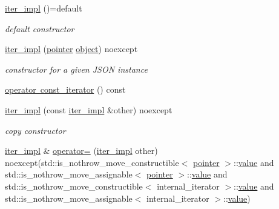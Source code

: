\begin{DoxyCompactItemize}
\item 
\mbox{\hyperlink{classnlohmann_1_1basic__json_1_1iter__impl_a3e45be67e4384b3eacb72bd6147a6a91}{iter\+\_\+impl}} ()=default
\begin{DoxyCompactList}\small\item\em default constructor \end{DoxyCompactList}\item 
\mbox{\hyperlink{classnlohmann_1_1basic__json_1_1iter__impl_aa496f5348569e75d65592f25e1664770}{iter\+\_\+impl}} (\mbox{\hyperlink{classnlohmann_1_1basic__json_1_1iter__impl_a3dddd7fa38b36e2531700ceb4a1ce9a8}{pointer}} \mbox{\hyperlink{classnlohmann_1_1basic__json_a9f42ee7d10eee2d5a73fd94ca7f767ca}{object}}) noexcept
\begin{DoxyCompactList}\small\item\em constructor for a given J\+S\+ON instance \end{DoxyCompactList}\item 
\mbox{\hyperlink{classnlohmann_1_1basic__json_1_1iter__impl_af1963645f99993ac5d0d2f8516e07212}{operator const\+\_\+iterator}} () const
\item 
\mbox{\hyperlink{classnlohmann_1_1basic__json_1_1iter__impl_a94c010c069b5aed9e064e0579eac9a64}{iter\+\_\+impl}} (const \mbox{\hyperlink{classnlohmann_1_1basic__json_1_1iter__impl}{iter\+\_\+impl}} \&other) noexcept
\begin{DoxyCompactList}\small\item\em copy constructor \end{DoxyCompactList}\item 
\mbox{\hyperlink{classnlohmann_1_1basic__json_1_1iter__impl}{iter\+\_\+impl}} \& \mbox{\hyperlink{classnlohmann_1_1basic__json_1_1iter__impl_a083d9d5465de7ddfb6108f404ce54be3}{operator=}} (\mbox{\hyperlink{classnlohmann_1_1basic__json_1_1iter__impl}{iter\+\_\+impl}} other) noexcept(std\+::is\+\_\+nothrow\+\_\+move\+\_\+constructible$<$ \mbox{\hyperlink{classnlohmann_1_1basic__json_1_1iter__impl_a3dddd7fa38b36e2531700ceb4a1ce9a8}{pointer}} $>$\+::\mbox{\hyperlink{classnlohmann_1_1basic__json_1_1iter__impl_a92e849ca687355935c02f492be936b68}{value}} and std\+::is\+\_\+nothrow\+\_\+move\+\_\+assignable$<$ \mbox{\hyperlink{classnlohmann_1_1basic__json_1_1iter__impl_a3dddd7fa38b36e2531700ceb4a1ce9a8}{pointer}} $>$\+::\mbox{\hyperlink{classnlohmann_1_1basic__json_1_1iter__impl_a92e849ca687355935c02f492be936b68}{value}} and std\+::is\+\_\+nothrow\+\_\+move\+\_\+constructible$<$ internal\+\_\+iterator $>$\+::\mbox{\hyperlink{classnlohmann_1_1basic__json_1_1iter__impl_a92e849ca687355935c02f492be936b68}{value}} and std\+::is\+\_\+nothrow\+\_\+move\+\_\+assignable$<$ internal\+\_\+iterator $>$\+::\mbox{\hyperlink{classnlohmann_1_1basic__json_1_1iter__impl_a92e849ca687355935c02f492be936b68}{value}})

\end{DoxyCompactItemize}
